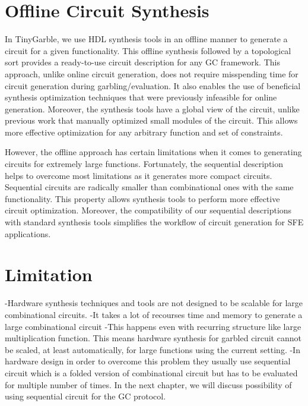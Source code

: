 \section{Offline Circuit Synthesis}
In TinyGarble, we use HDL synthesis tools in an offline manner to generate a circuit for a given functionality.
This offline synthesis followed by a topological sort provides a ready-to-use circuit description for any GC framework.
This approach, unlike online circuit generation, does not require misspending time for circuit generation during garbling/evaluation.
It also enables the use of beneficial synthesis optimization techniques that were previously infeasible for online generation.
Moreover, the synthesis tools have a global view of the circuit, unlike previous work that manually optimized small modules of the circuit.
This allows more effective optimization for any arbitrary function and set of constraints.

However, the offline approach has certain limitations when it comes to generating circuits for extremely large functions.
Fortunately, the sequential description helps to overcome most limitations as it generates more compact circuits.
Sequential circuits are radically smaller than combinational ones with the same functionality.
This property allows synthesis tools to perform more effective circuit optimization.
Moreover, the compatibility of our sequential descriptions with standard synthesis tools simplifies the workflow of circuit generation for SFE applications.

\section{Limitation}
-Hardware synthesis techniques and tools are not designed to be scalable for large combinational circuits.
-It takes a lot of recourses time and memory to generate a large combinational circuit
-This happens even with recurring structure like large multiplication function.
This means hardware synthesis for garbled circuit cannot be scaled, at least automatically, for large functions using the current setting.
-In hardware design in order to overcome this problem they usually use sequential circuit which is a folded version of combinational circuit but has to be evaluated for multiple number of times.
In the next chapter, we will discuss possibility of using sequential circuit for the GC protocol.
